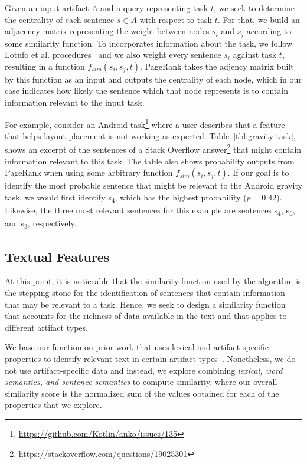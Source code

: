 Given an input artifact $A$ and a query representing task $t$, we seek to determine the centrality of each sentence $s \in A$ with respect to task $t$.
For that, we build an adjacency matrix representing the weight between nodes $s_i$ and $s_j$ according to some similarity function.
To incorporates information about the task,
we follow Lotufo et al. procedures~\cite{Lotufo2012} and we also weight every sentence $s_i$ against task $t$, resulting in a function  
$f_{sim}(s_i, s_j, t)$. 
PageRank takes the adjency matrix built by this function as an input and outputs the centrality of each node, which in our case indicates how likely the sentence which that node represents 
is to contain information relevant to the input task.



For example, consider an Android task\footnote{\url{https://github.com/Kotlin/anko/issues/135}} where a user describes that a feature that helps layout placement 
is not working as expected.
Table~\ref{tbl:gravity-task}, shows an excerpt of the sentences of a Stack Overflow answer\footnote{\url{https://stackoverflow.com/questions/19025301}}
that might contain information relevant to this task.
The table also shows probability outputs from PageRank when using some arbitrary function $f_{sim}(s_i, s_j, t)$.
If our goal is to identify the most probable sentence that might be relevant to the Android gravity task, 
we would first identify s\textsubscript{4}, which has the highest probability ($p=0.42$).
Likewise, the three most relevant sentences for this example are sentences s\textsubscript{4}, s\textsubscript{5}, and s\textsubscript{3}, respectively.






\subsection{Textual Features}


At this point, it is noticeable that the similarity function used by the algorithm is the stepping stone for the identification of sentences that contain information that may be relevant to a task.  
Hence, we seek to design a similarity function that accounts for the richness of data available in the text and that applies to different artifact types.



We base our function on prior work that uses lexical and artifact-specific properties
to identify relevant text in certain artifact types~\cite{Ponzanelli2015, Xu2017,Lotufo2012}.
Nonetheless, we do not use artifact-specific data and instead, we explore combining \textit{lexical, word semantics, and sentence semantics} to 
compute similarity, where our overall similarity score is the normalized sum of the values obtained for each of the properties that we explore.



